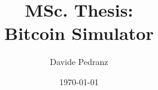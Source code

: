 \documentclass[11pt, a4paper]{report}
\title{MSc. Thesis:\\Bitcoin Simulator}
\author{Davide Pedranz}
\date{\today}
\begin{document}
\begin{titlepage}
	\maketitle
\end{titlepage}

\tableofcontents

% 



% 
% 
% 

\printbibliography
\end{document}
